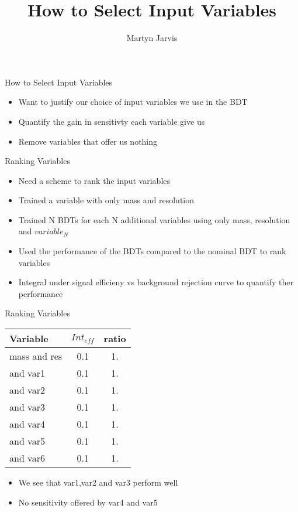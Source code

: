\documentclass[t]{beamer}
\author{Martyn Jarvis}
\title[Input Variables]{How to Select Input Variables}
\begin{document}


\begin{frame}{How to Select Input Variables}
  \begin{itemize}  
   \item Want to justify our choice of input variables we use in the BDT
   \item Quantify the gain in sensitivty each variable give us
   \item Remove variables that offer us nothing
   \end{itemize}
\end{frame}

\begin{frame}{Ranking Variables}
  \begin{itemize}  
   \item Need a scheme to rank the input variables
   \item Trained a variable with only mass and resolution
   \item Trained N BDTs for each N additional variables using only mass,
resolution and $variable_N$
   \item Used the performance of the BDTs compared to the nominal BDT to rank variables
   \item Integral under signal efficieny vs background rejection curve to
quantify ther performance
   \end{itemize}
\end{frame}


\begin{frame}{Ranking Variables}
  \begin{center}
    \begin{tabular}{| l | c c |} \hline
      Variable & $Int_{eff}$ & ratio \\ \hline
      mass and res & 0.1     & 1.    \\ \hline
      and var1     & 0.1     & 1.    \\
      and var2     & 0.1     & 1.    \\
      and var3     & 0.1     & 1.    \\
      and var4     & 0.1     & 1.    \\
      and var5     & 0.1     & 1.    \\
      and var6     & 0.1     & 1.    \\
      \hline
    \end{tabular}
  \end{center}
  \begin{itemize}  
    \item We see that var1,var2 and var3 perform well
    \item No sensitivity offered by var4 and var5
  \end{itemize}
\end{frame}
 
\end{document}
